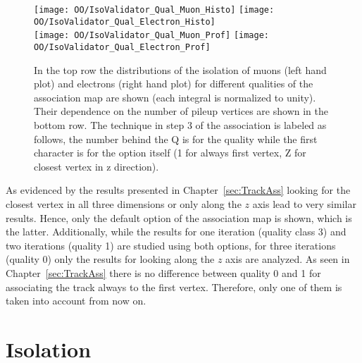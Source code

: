 \begin{figure}[Hb]
    \centering
    \texttt{[image: OO/IsoValidator\_Qual\_Muon\_Histo]}
    \texttt{[image: OO/IsoValidator\_Qual\_Electron\_Histo]}
    \\
    \texttt{[image: OO/IsoValidator\_Qual\_Muon\_Prof]}
    \texttt{[image: OO/IsoValidator\_Qual\_Electron\_Prof]}
    \caption[Distribution of the isolation of muons and electrons and their dependence on the number of pileup vertices for different qualities of the association map]{In the top row the distributions of the isolation of muons (left hand plot) and electrons (right hand plot) for different qualities of the association map are shown (each integral is normalized to unity). Their dependence on the number of pileup vertices are shown in the bottom row. The technique in step 3 of the association is labeled as follows, the number behind the Q is for the quality while the first character is for the option itself (1 for always first vertex, Z for closest vertex in z direction).  \label{plot:OOIsoQual}}
\end{figure}

As evidenced by the results presented in Chapter~\ref{sec:TrackAss} looking for the closest vertex in all three dimensions or only along the $z$ axis lead to very similar results. Hence, only the default option of the association map is shown, which is the latter. Additionally, while the results for one iteration (quality class 3) and two iterations (quality 1) are studied using both options, for three iterations (quality 0) only the results for looking along the $z$ axis are analyzed. As seen in Chapter~\ref{sec:TrackAss} there is no difference between quality 0 and 1 for associating the track always to the first vertex. Therefore, only one of them is taken into account from now on.

\section{Isolation \label{sec:OOIso}}

